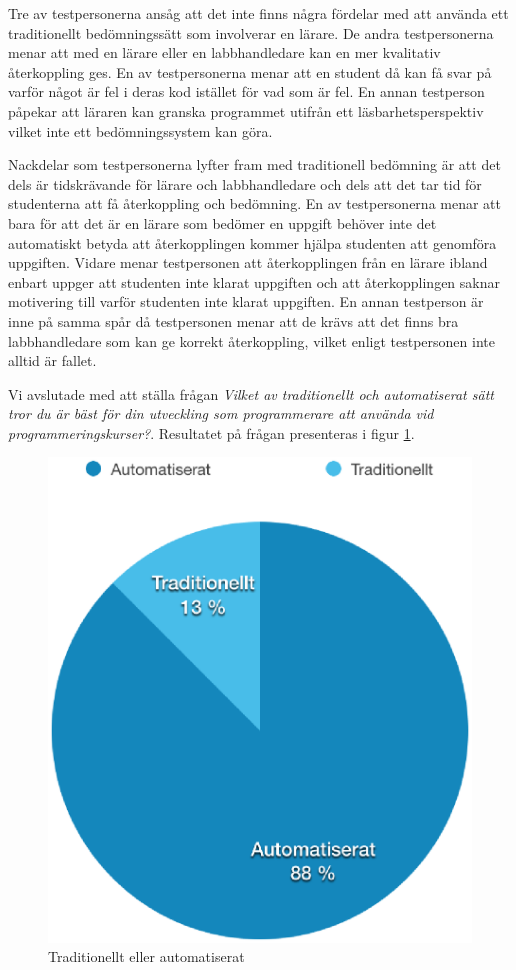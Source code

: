 \documentclass[a4paper,11pt]{article}
\begin{document}
{Tre av testpersonerna ansåg att det inte finns några fördelar med att använda ett traditionellt bedömningssätt som involverar en lärare. De andra testpersonerna menar att med en lärare eller en labbhandledare kan en mer kvalitativ återkoppling ges. En av testpersonerna menar att en student då kan få svar på varför något är fel i deras kod istället för vad som är fel. En annan testperson påpekar att läraren kan granska programmet utifrån ett läsbarhetsperspektiv vilket inte ett bedömningssystem kan göra.

Nackdelar som testpersonerna lyfter fram med traditionell bedömning är att det dels är tidskrävande för lärare och labbhandledare och dels att det tar tid för studenterna att få återkoppling och bedömning. En av testpersonerna menar att bara för att det är en lärare som bedömer en uppgift behöver inte det automatiskt betyda att återkopplingen kommer hjälpa studenten att genomföra uppgiften. Vidare menar testpersonen att återkopplingen från en lärare ibland enbart uppger att studenten inte klarat uppgiften och att återkopplingen saknar motivering till varför studenten inte klarat uppgiften. En annan testperson är inne på samma spår då testpersonen menar att de krävs att det finns bra labbhandledare som kan ge korrekt återkoppling, vilket enligt testpersonen inte alltid är fallet.

Vi avslutade med att ställa frågan \textit{Vilket av traditionellt och automatiserat sätt tror du är bäst för din utveckling som programmerare att använda vid programmeringskurser?}. Resultatet på frågan presenteras i figur \ref{fig:TradvsAuto}.

\begin{figure}[ht!]
\centering
\includegraphics[scale=0.5]{trad_vs_auto.eps}
\caption{Traditionellt eller automatiserat}
\label{fig:TradvsAuto}
\end{figure}

}
\end{document}

